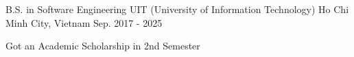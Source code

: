 \begin{cventries}
  \cventry
    {B.S. in Software Engineering}
    {UIT (University of Information Technology)}
    {Ho Chi Minh City, Vietnam}
    {Sep. 2017 - 2025}
    {
      \begin{cvitems}
        \item {Got an Academic Scholarship in 2nd Semester}
      \end{cvitems}
    }
\end{cventries}
